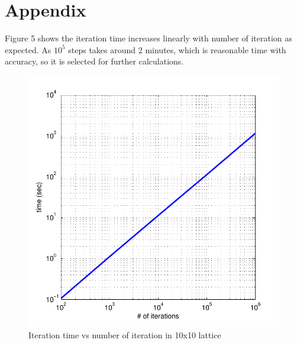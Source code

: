\documentclass[]{article}
\begin{document}
\section*{Appendix}
Figure 5 shows the iteration time increases linearly with number of iteration as expected. As $10^5$ steps takes around 2 minutes, which is reasonable time with accuracy, so it is selected for further calculations.
\begin{figure}[H]
  \centering
  \includegraphics[scale=0.6]{figures/fig_7}%
  \caption{\label{fig:epsart} Iteration time vs number of iteration in 10x10 lattice}
\end{figure}
\end{document}
